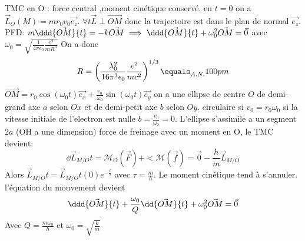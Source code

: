 \begin{Answer}
	\Question TMC en O : force central ,moment cinétique conservé. en $t=0$ on a $\vec{L}_{O}(M) = mr_0v_0\vec{e_z}$.
	$\forall t \vec{L} \perp \vec{OM}$ donc la trajectoire est dans le plan de normal $\vec{e_z}$.
	\Question PFD:
	$m\ddd{\vec{OM}}{t} =-k\vec{OM} \implies \ddd{\vec{OM}}{t} + \omega_0^2 \vec{OM} = \vec{0}$ avec $\omega_0=\sqrt{\frac{1}{4\pi\epsilon_0}\frac{e^2}{mR^3}}$
	On a donc \[R=\left(\frac{\lambda_0^2}{16\pi^3\epsilon_0}\frac{e^2}{mc^2} \right)^{1/3}\equals_{A.N.} 100 pm \]
	\Question
	$\vec{OM} = r_0\cos(\omega_0t)\vec{e_x}+\frac{v_0}{\omega_0}\sin(\omega_0t)\vec{e_y}$
	on a une ellipse de centre $O$ de demi-grand axe $a$ selon $Ox$ et de demi-petit axe $b$ selon $Oy$.
	\Question circulaire si $v_0=r_0\omega_0$ si la vitesse initiale de l'electron est nulle $b=\frac{v_0}{\omega_0}=0$. L'ellipse s'assimile a un segment $2a$ (OH a une dimension)
	\Question force de freinage avec un moment en O, le TMC devient:
	\[\dd{\vec{L}_{M/O}}{t} = \mathcal{M}_O(\vec{F})+<\mathcal{M}(\vec{f}) = \vec{0} - \frac{h}{m}\vec{L}_{M/O}
	\]
	Alors $\vec{L}_{M/O}{t} =\vec{L}_{M/O}{t}(0)e^{-\frac{t}{\tau}} $ avec $\tau=\frac{m}{h}$.
	Le moment cinétique tend à s'annuler.
	l'équation du mouvement devient
	\[\ddd{\vec{OM}}{t} + \frac{\omega_0}{Q}\dd{\vec{OM}}{t} + \omega_0^2 \vec{OM} = \vec{0}\]
	Avec $Q=\frac{m\omega_0}{h}$ et $\omega_0=\sqrt{\frac{k}{m}}$
\end{Answer}
